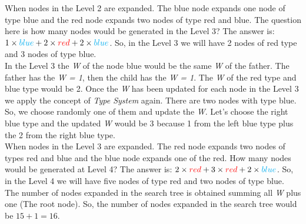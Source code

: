 When nodes in the Level 2 are expanded. The blue node expands one node of type blue and the red node expands two nodes of type red and blue. The question here is how many nodes would be generated in the Level 3? The answer is: $1 \times \textcolor{cyan}{blue} + 2 \times \textcolor{red}{red} + 2 \times \textcolor{cyan}{blue}$. So, in the Level 3 we will have 2 nodes of red type and 3 nodes of type blue. \\ 

In the Level 3 the \textit{W} of the node blue would be the same \textit{W} of the father. The father has the \textit{W = 1}, then the child has the \textit{W = 1}. The \textit{W} of the red type and blue type would be 2. Once the \textit{W} has been updated for each node in the Level 3 we apply the concept of \textit{Type System} again. There are two nodes with type blue. So, we choose randomly one of them and update the \textit{W}. Let's choose the right blue type and the updated \textit{W} would be 3 because 1 from the left blue type plus the 2 from the right blue type. \\

When nodes in the Level 3 are expanded. The red node expands two nodes of types red and blue and the blue node expands one of the red. How many nodes would be generated at Level 4? The answer is: $2 \times \textcolor{red}{red} + 3 \times \textcolor{red}{red} + 2 \times \textcolor{cyan}{blue}$. So, in the Level 4 we will have five nodes of type red and two nodes of type blue.\\

The number of nodes expanded in the search tree is obtained summing all \textit{W} plus one (The root node). So, the number of nodes expanded in the search tree would be $ 15 + 1 = 16$. \\

